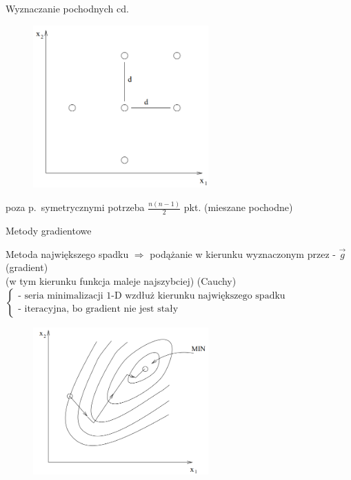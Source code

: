  \begin{frame}{Wyznaczanie pochodnych cd.}

    \begin{figure}
		\centering
		\includegraphics[height=0.6\textheight ,width=0.6\textwidth]{img/17/wyznaczanie_pochodnych}
	\end{figure}
    \begin{block}{}
      poza p.~symetrycznymi potrzeba $\frac{n(n-1)}{2}$ pkt. (mieszane pochodne)
  	\end{block}

  \end{frame}

  \begin{frame}{Metody gradientowe}

    \begin{block}{Metoda największego spadku}
      $\Rightarrow$ podążanie w kierunku wyznaczonym przez - $\vec g$ (gradient)
      \\(w tym kierunku funkcja maleje najszybciej) (Cauchy)
      \\$\left\{
        \begin{array}{l}
          \text{- seria minimalizacji 1-D wzdłuż kierunku największego spadku} \\
          \text{- iteracyjna, bo gradient nie jest stały}
	    \end{array}
	  \right.$
  	\end{block}
    \begin{figure}
		\centering
		\includegraphics[height=0.5\textheight ,width=0.6\textwidth]{img/17/high_fall_met_1}
	\end{figure}

  \end{frame}

